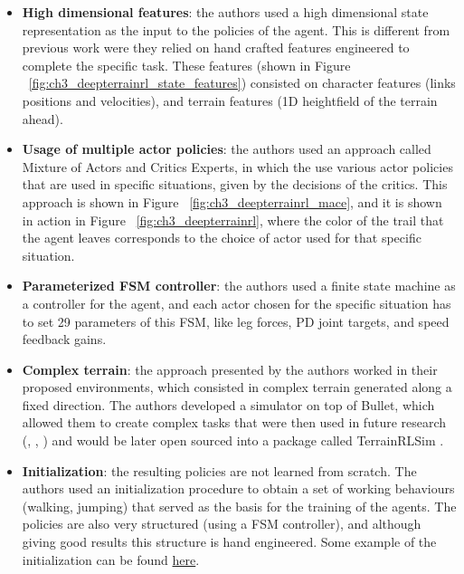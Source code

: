 \begin{itemize}
    \item \textbf{High dimensional features}: the authors used a high dimensional 
          state representation as the input to the policies of the agent.
          This is different from previous work were they relied on hand crafted
          features engineered to complete the specific task. These features (shown in
          Figure ~\ref{fig:ch3_deepterrainrl_state_features}) consisted on character 
          features (links positions and velocities), and terrain features (1D heightfield 
          of the terrain ahead).


    \item \textbf{Usage of multiple actor policies}: the authors used an approach
          called Mixture of Actors and Critics Experts, in which the use various
          actor policies that are used in specific situations, given by the decisions 
          of the critics. This approach is shown in Figure ~\ref{fig:ch3_deepterrainrl_mace},
          and it is shown in action in Figure ~\ref{fig:ch3_deepterrainrl}, where the
          color of the trail that the agent leaves corresponds to the choice of actor
          used for that specific situation.

    \item \textbf{Parameterized FSM controller}: the authors used a
          finite state machine as a controller for the agent, and each actor
          chosen for the specific situation has to set 29 parameters of this
          FSM, like leg forces, PD joint targets, and speed feedback gains.

    \item \textbf{Complex terrain}: the approach presented by the authors
          worked in their proposed environments, which consisted in complex terrain
          generated along a fixed direction. The authors developed a simulator on
          top of Bullet, which allowed them to create complex tasks that were then
          used in future research (\cite{ActuationChoice}, \cite{DeepLoco}, \cite{DeepMimic})
          and would be later open sourced into a package called TerrainRLSim \citep{TerrainRLSim}.

    \item \textbf{Initialization}: the resulting policies are not learned from scratch.
          The authors used an initialization procedure to obtain a set of working
          behaviours (walking, jumping) that served as the basis for the training
          of the agents. The policies are also very structured (using a FSM controller),
          and although giving good results this structure is hand engineered. Some
          example of the initialization can be found \href{https://youtu.be/8qQmL3f2fd8?t=587}{here}.


\end{itemize}
